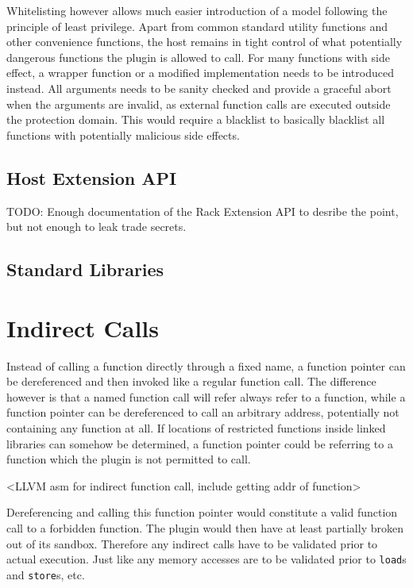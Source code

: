 Whitelisting however allows much easier introduction of a model following the
principle of least privilege. Apart from common standard utility functions and
other convenience functions, the host remains in tight control of what
potentially dangerous functions the plugin is allowed to call. For many
functions with side effect, a wrapper function or a modified implementation
needs to be introduced instead. All arguments needs to be sanity checked and
provide a graceful abort when the arguments are invalid, as external function
calls are executed outside the protection domain. This would require a blacklist
to basically blacklist all functions with potentially malicious side effects.

\subsection {Host Extension API}

TODO: Enough documentation of the Rack Extension API to desribe the point, but
not enough to leak trade secrets.

\subsection {Standard Libraries}



\section {Indirect Calls}

Instead of calling a function directly through a fixed name, a function pointer
can be dereferenced and then invoked like a regular function call. The
difference however is that a named function call will refer always refer to a
function, while a function pointer can be dereferenced to call an arbitrary
address, potentially not containing any function at all. If locations of
restricted functions inside linked libraries can somehow be determined, a
function pointer could be referring to a function which the plugin is not
permitted to call.

<LLVM asm for indirect function call, include getting addr of function>

Dereferencing and calling this function pointer would constitute a valid
function call to a forbidden function. The plugin would then have at least
partially broken out of its sandbox. Therefore any indirect calls have to be
validated prior to actual execution. Just like any memory accesses are to be
validated prior to \texttt{load}s and \texttt{store}s, etc.

